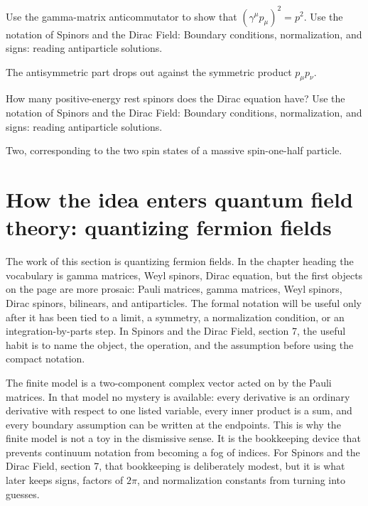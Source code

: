\begin{exercise}
Use the gamma-matrix anticommutator to show that \((\gamma^\mu p_\mu)^2=p^2\).  Use the notation of Spinors and the Dirac Field: Boundary conditions, normalization, and signs: reading antiparticle solutions.
\begin{answer}
The antisymmetric part drops out against the symmetric product \(p_\mu p_\nu\).
\end{answer}
\end{exercise}

\begin{exercise}
How many positive-energy rest spinors does the Dirac equation have?  Use the notation of Spinors and the Dirac Field: Boundary conditions, normalization, and signs: reading antiparticle solutions.
\begin{answer}
Two, corresponding to the two spin states of a massive spin-one-half particle.
\end{answer}
\end{exercise}



\section{How the idea enters quantum field theory: quantizing fermion fields}

The work of this section is quantizing fermion fields.  In the chapter heading the vocabulary is gamma matrices, Weyl spinors, Dirac equation, but the first objects on the page are more prosaic: Pauli matrices, gamma matrices, Weyl spinors, Dirac spinors, bilinears, and antiparticles.  The formal notation will be useful only after it has been tied to a limit, a symmetry, a normalization condition, or an integration-by-parts step.  In Spinors and the Dirac Field, section 7, the useful habit is to name the object, the operation, and the assumption before using the compact notation.

The finite model is a two-component complex vector acted on by the Pauli matrices.  In that model no mystery is available: every derivative is an ordinary derivative with respect to one listed variable, every inner product is a sum, and every boundary assumption can be written at the endpoints.  This is why the finite model is not a toy in the dismissive sense.  It is the bookkeeping device that prevents continuum notation from becoming a fog of indices.  For Spinors and the Dirac Field, section 7, that bookkeeping is deliberately modest, but it is what later keeps signs, factors of \(2\pi\), and normalization constants from turning into guesses.


